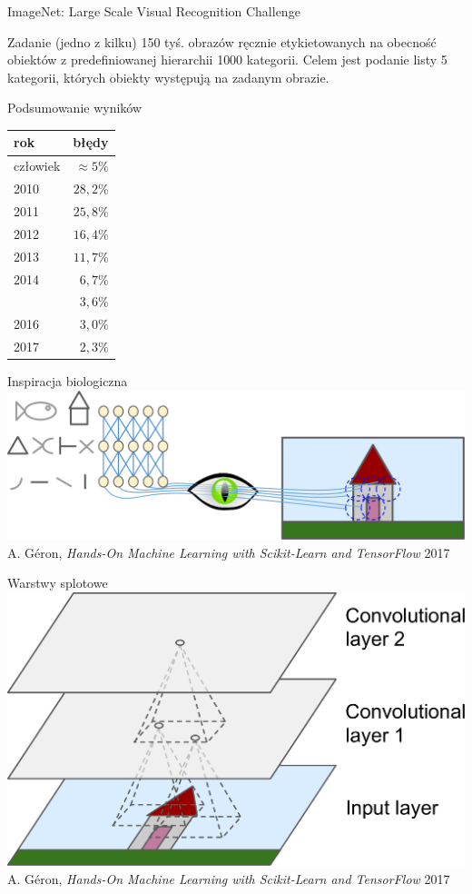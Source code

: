 \documentclass{sa}
\subtitle{Splotowe sieci neuronowe\\Convolutional neural networks}
\begin{document}
\begin{frame}
\titlepage
\end{frame}

\begin{frame}{ImageNet: Large Scale Visual Recognition Challenge}
\begin{block}{Zadanie (jedno z kilku)}
150 tyś. obrazów ręcznie etykietowanych na obecność obiektów z predefiniowanej hierarchii 1000 kategorii.
Celem jest podanie listy 5 kategorii, których obiekty występują na zadanym obrazie.
\end{block}
\pause
\begin{block}{Podsumowanie wyników}
\centering
\begin{tabular}{lr}
rok & błędy \\
\hline
człowiek & $\approx5\%$ \\
\hline
2010 & $28{,}2\%$ \\
2011 & $25{,}8\%$ \\
2012 & $16{,}4\%$ \\
2013 & $11{,}7\%$ \\
2014 & $6{,}7\%$ \\
\pause
2015 & \alert{$3{,}6\%$} \\
2016 & \alert{$3{,}0\%$} \\
2017 & \alert{$2{,}3\%$}
\end{tabular}
\end{block}
\end{frame}

\begin{frame}{Inspiracja biologiczna}
\includegraphics[width=\textwidth]{mlst_1301.png}
{\vfill\footnotesize A. Géron, \emph{Hands-On Machine Learning with Scikit-Learn and TensorFlow} 2017}
\end{frame}

\begin{frame}{Warstwy splotowe}
\includegraphics[width=\textwidth]{mlst_1302.png}
{\vfill\footnotesize A. Géron, \emph{Hands-On Machine Learning with Scikit-Learn and TensorFlow} 2017}
\end{frame}
\end{document}
